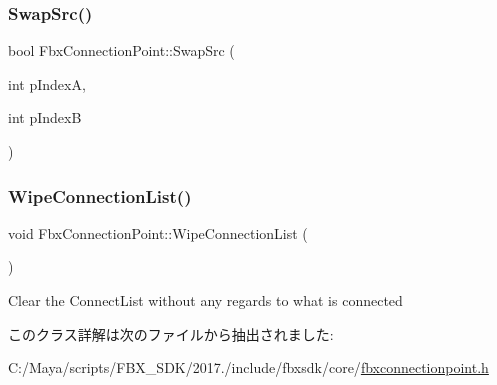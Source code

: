 \mbox{\label{class_fbx_connection_point_a0a26176bfcdd1edaf60a64afa3aa4f16}} 
\subsubsection{\texorpdfstring{Swap\+Src()}{SwapSrc()}}
{\footnotesize\ttfamily bool Fbx\+Connection\+Point\+::\+Swap\+Src (\begin{DoxyParamCaption}\item[{int}]{p\+IndexA,  }\item[{int}]{p\+IndexB }\end{DoxyParamCaption})}

\mbox{\label{class_fbx_connection_point_a9b1d6c109c6d2894aecbe9649660c4fd}} 
\subsubsection{\texorpdfstring{Wipe\+Connection\+List()}{WipeConnectionList()}}
{\footnotesize\ttfamily void Fbx\+Connection\+Point\+::\+Wipe\+Connection\+List (\begin{DoxyParamCaption}{ }\end{DoxyParamCaption})}



Clear the Connect\+List without any regards to what is connected 



このクラス詳解は次のファイルから抽出されました\+:\begin{DoxyCompactItemize}
\item 
C\+:/\+Maya/scripts/\+F\+B\+X\+\_\+\+S\+D\+K/2017./include/fbxsdk/core/\hyperlink{fbxconnectionpoint_8h}{fbxconnectionpoint.\+h}\end{DoxyCompactItemize}
